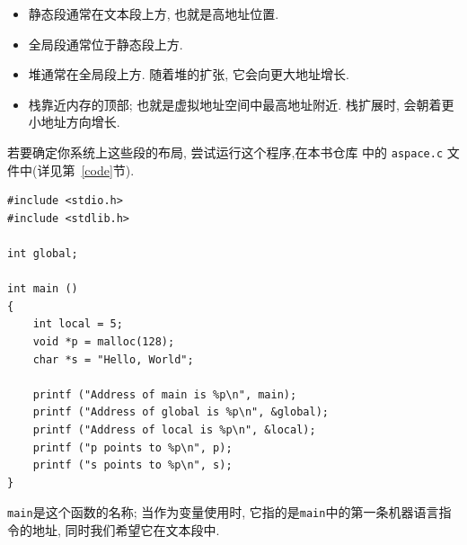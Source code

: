 \documentclass[12pt]{book}
\begin{document}
{\begin{itemize}
\item 静态段通常在文本段上方, 也就是高地址位置.

\item 全局段通常位于静态段上方.

\item 堆通常在全局段上方. 随着堆的扩张, 它会向更大地址增长.
  
\item 栈靠近内存的顶部; 也就是虚拟地址空间中最高地址附近.
栈扩展时, 会朝着更小地址方向增长.

\end{itemize}


若要确定你系统上这些段的布局, 尝试运行这个程序,在本书仓库
中的 {\tt aspace.c} 文件中(详见第~\ref{code}节). 


\begin{verbatim}
#include <stdio.h>
#include <stdlib.h>

int global;

int main ()
{
    int local = 5;
    void *p = malloc(128);
    char *s = "Hello, World";

    printf ("Address of main is %p\n", main);
    printf ("Address of global is %p\n", &global);
    printf ("Address of local is %p\n", &local);
    printf ("p points to %p\n", p);
    printf ("s points to %p\n", s);
}
\end{verbatim}

%
%
%
%
%
{\tt main}是这个函数的名称; 当作为变量使用时, 
它指的是{\tt main}中的第一条机器语言指令的地址, 
同时我们希望它在文本段中.

}
\end{document}

